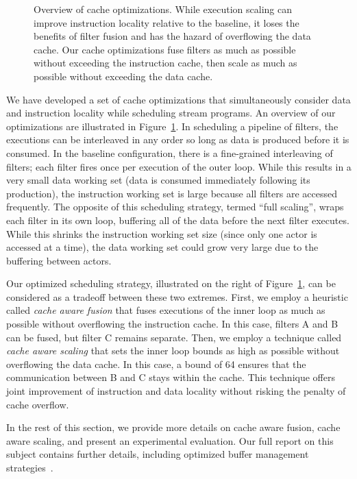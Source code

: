 \begin{figure}[t]
\centering
{}
\caption[Overview of cache optimizations]{Overview of cache 
optimizations.  While execution scaling can improve instruction
locality relative to the baseline, it loses the benefits of filter
fusion and has the hazard of overflowing the data cache.  Our cache
optimizations fuse filters as much as possible without exceeding the
instruction cache, then scale as much as possible without exceeding
the data cache.\protect\label{fig:cacheopt}}
\end{figure}

We have developed a set of cache optimizations that simultaneously
consider data and instruction locality while scheduling stream
programs.  An overview of our optimizations are illustrated in
Figure~\ref{fig:cacheopt}.  In scheduling a pipeline of filters, the
executions can be interleaved in any order so long as data is produced
before it is consumed.  In the baseline configuration, there is a
fine-grained interleaving of filters; each filter fires once per
execution of the outer loop.  While this results in a very small data
working set (data is consumed immediately following its production),
the instruction working set is large because all filters are accessed
frequently.  The opposite of this scheduling strategy, termed ``full
scaling'', wraps each filter in its own loop, buffering all of the
data before the next filter executes.  While this shrinks the
instruction working set size (since only one actor is accessed at a
time), the data working set could grow very large due to the buffering
between actors.

Our optimized scheduling strategy, illustrated on the right of
Figure~\ref{fig:cacheopt}, can be considered as a tradeoff between
these two extremes.  First, we employ a heuristic called {\it cache
aware fusion} that fuses executions of the inner loop as much as
possible without overflowing the instruction cache.  In this case,
filters A and B can be fused, but filter C remains separate.  Then, we
employ a technique called {\it cache aware scaling} that sets the
inner loop bounds as high as possible without overflowing the data
cache.  In this case, a bound of 64 ensures that the communication
between B and C stays within the cache.  This technique offers joint
improvement of instruction and data locality without risking the
penalty of cache overflow.

In the rest of this section, we provide more details on cache aware
fusion, cache aware scaling, and present an experimental evaluation.
Our full report on this subject contains further details, including
optimized buffer management
strategies~\cite{sermulins-lctes05,sermulins-thesis}.

